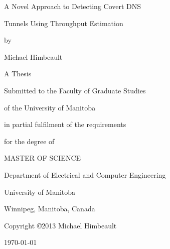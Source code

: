 \documentclass[12pt]{report}
\theoremstyle{remark}
\theoremstyle{definition}
\theoremstyle{definition}
\theoremstyle{definition}
\begin{document}

%

\pagestyle{empty}

\begin{titlepage}
\centerline{\huge{A Novel Approach to Detecting Covert DNS}}
\vspace{10mm}
\centerline{\huge{Tunnels Using Throughput Estimation}}
\vspace{20mm}
\centerline{by}
\vspace{5mm}
\centerline{\large{Michael Himbeault}}
\vspace{20mm}
\centerline{\large{A Thesis}}
\vspace{3mm}
\centerline{\large{Submitted to the Faculty of Graduate Studies}}
\vspace{3mm}
\centerline{\large{of the University of Manitoba}}
\vspace{3mm}
\centerline{\large{in partial fulfilment of the requirements}}
\vspace{3mm}
\centerline{\large{for the degree of}}
\vspace{13mm}
\centerline{\LARGE{MASTER OF SCIENCE}}
\vspace{15mm}
\centerline{\large{Department of Electrical and Computer Engineering}}
\vspace{2mm}
\centerline{\large{University of Manitoba}}
\vspace{2mm}
\centerline{\large{Winnipeg, Manitoba, Canada}}
\vspace{30mm}
\centerline{\large{Copyright \copyright 2013 Michael Himbeault}}
\centerline{}
\vfill
\centerline{\today}
\end{titlepage}
\end{document}
